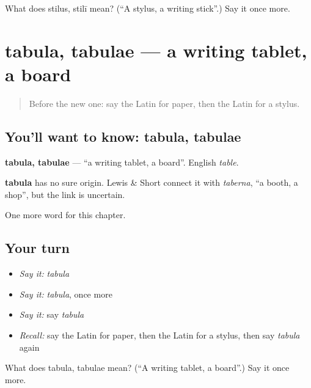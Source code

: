 \begin{tcolorbox}[breakable,colback=teal!4,colframe=teal!35!black,title={Before you move on}]
What does stilus, stilī mean? (\textquotedblleft{}A stylus, a writing stick\textquotedblright{}.) Say it once more.
\end{tcolorbox}
\section[tabula, tabulae]{tabula, tabulae — a writing tablet, a board}

\label{lesson:LA-C84-tabula}



\begin{quote}
Before the new one: say the Latin for paper, then the Latin for a stylus.
\end{quote}

\subsection*{You'll want to know: tabula, tabulae}
\textbf{tabula, tabulae} — \textquotedblleft{}a writing tablet, a board\textquotedblright{}. English \emph{table}.

\begin{cousinweb}
\textbf{tabula} has no sure origin. Lewis \& Short connect it with \emph{taberna}, \textquotedblleft{}a booth, a shop\textquotedblright{}, but the link is uncertain.
\end{cousinweb}

\begin{grammarlens}[title={What you've built}]
One more word for this chapter.
\end{grammarlens}

\subsection*{Your turn}
\begin{itemize}
\raggedright
  \item \emph{Say it:} \emph{tabula}
  \item \emph{Say it:} \emph{tabula}, once more
  \item \emph{Say it:} say \emph{tabula}
  \item \emph{Recall:} say the Latin for paper, then the Latin for a stylus, then say \emph{tabula} again
\end{itemize}

\begin{tcolorbox}[breakable,colback=teal!4,colframe=teal!35!black,title={Before you move on}]
What does tabula, tabulae mean? (\textquotedblleft{}A writing tablet, a board\textquotedblright{}.) Say it once more.
\end{tcolorbox}
